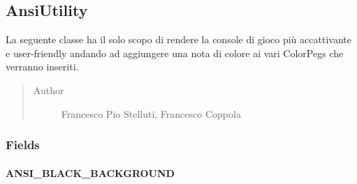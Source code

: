 \documentclass[letterpaper,10pt,italian]{sphinxmanual}
\begin{document}
\subsection{AnsiUtility}
\label{\detokenize{source/it/unicam/cs/pa/mastermind/ui/AnsiUtility:ansiutility}}\label{\detokenize{source/it/unicam/cs/pa/mastermind/ui/AnsiUtility::doc}}

\begin{fulllineitems}
\label{\detokenize{source/it/unicam/cs/pa/mastermind/ui/AnsiUtility:it.unicam.cs.pa.mastermind.ui.AnsiUtility}}
La seguente classe ha il solo scopo di rendere la console di gioco più accattivante e user-friendly andando ad aggiungere una nota di colore ai vari ColorPegs che verranno inseriti.
\begin{quote}\begin{description}
\item[{Author}] \leavevmode
Francesco Pio Stelluti, Francesco Coppola

\end{description}\end{quote}

\end{fulllineitems}



\subsubsection{Fields}
\label{\detokenize{source/it/unicam/cs/pa/mastermind/ui/AnsiUtility:fields}}

\paragraph{ANSI\_BLACK\_BACKGROUND}
\label{\detokenize{source/it/unicam/cs/pa/mastermind/ui/AnsiUtility:ansi-black-background}}

\begin{fulllineitems}
\label{\detokenize{source/it/unicam/cs/pa/mastermind/ui/AnsiUtility:it.unicam.cs.pa.mastermind.ui.AnsiUtility.ANSI_BLACK_BACKGROUND}}
\end{fulllineitems}
\end{document}
